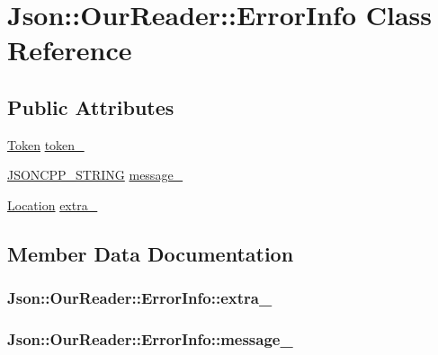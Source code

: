 \hypertarget{classJson_1_1OurReader_1_1ErrorInfo}{}\section{Json\+:\+:Our\+Reader\+:\+:Error\+Info Class Reference}
\label{classJson_1_1OurReader_1_1ErrorInfo}
\subsection*{Public Attributes}
\begin{DoxyCompactItemize}
\item 
\hyperlink{classJson_1_1OurReader_1_1Token}{Token} \hyperlink{classJson_1_1OurReader_1_1ErrorInfo_ad05204ecabe5e7201a842935b874ae9a}{token\+\_\+}
\item 
\hyperlink{json_8hpp_a1e723f95759de062585bc4a8fd3fa4be}{J\+S\+O\+N\+C\+P\+P\+\_\+\+S\+T\+R\+I\+NG} \hyperlink{classJson_1_1OurReader_1_1ErrorInfo_af14b6bf58ee1cb3388c18ee336ee2394}{message\+\_\+}
\item 
\hyperlink{classJson_1_1OurReader_a1bdc7bbc52ba87cae6b19746f2ee0189}{Location} \hyperlink{classJson_1_1OurReader_1_1ErrorInfo_a77ba2d32a471c7b9bc14621b76a5bdab}{extra\+\_\+}
\end{DoxyCompactItemize}


\subsection{Member Data Documentation}
\subsubsection[{\texorpdfstring{extra\+\_\+}{extra_}}]{ Json\+::\+Our\+Reader\+::\+Error\+Info\+::extra\+\_\+}\hypertarget{classJson_1_1OurReader_1_1ErrorInfo_a77ba2d32a471c7b9bc14621b76a5bdab}{}\label{classJson_1_1OurReader_1_1ErrorInfo_a77ba2d32a471c7b9bc14621b76a5bdab}
\subsubsection[{\texorpdfstring{message\+\_\+}{message_}}]{ Json\+::\+Our\+Reader\+::\+Error\+Info\+::message\+\_\+}\hypertarget{classJson_1_1OurReader_1_1ErrorInfo_af14b6bf58ee1cb3388c18ee336ee2394}{}\label{classJson_1_1OurReader_1_1ErrorInfo_af14b6bf58ee1cb3388c18ee336ee2394}
